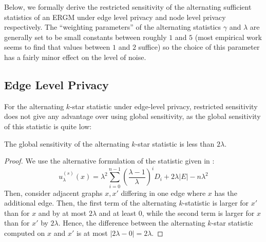 Below, we formally derive the restricted sensitivity of the alternating sufficient statistics of an ERGM under edge level privacy and node level privacy respectively. The ``weighting parameters'' of the alternating statistics $\gamma$ and $\lambda$ are generally set to be small constants between roughly $1$ and $5$ (most empirical work seems to find that values between $1$ and $2$ suffice) so the choice of this parameter has a fairly minor effect on the level of noise.

\subsection{Edge Level Privacy} 

For the alternating $k$-star statistic under edge-level privacy, restricted sensitivity does not
give any advantage over using global sensitivity, as the global sensitivity of this statistic is quite low:

\begin{claim}
The global sensitivity of the alternating $k$-star statistic is less than $2\lambda$. 
\end{claim}
\begin{proof}
We use the alternative formulation of the statistic given in :
$$u_\lambda^{(s)}(x) =  \lambda^2 \sum_{i = 0}^{n-1} \left(\frac{\lambda - 1}{\lambda}\right)^i D_i + 2 \lambda |E| - n \lambda^2$$
Then, consider adjacent graphs $x, x'$ differing in one edge where $x$ has the additional edge. Then, the first term of the alternating $k$-statistic is larger for $x'$ than for $x$ and by at most $2\lambda$ and at least $0$, while the second term is larger for $x$ than for $x'$ by $2\lambda$. Hence, the difference between the alternating $k$-star statistic computed on $x$ and $x'$ is at most $|2\lambda - 0| = 2\lambda$.
\end{proof}

